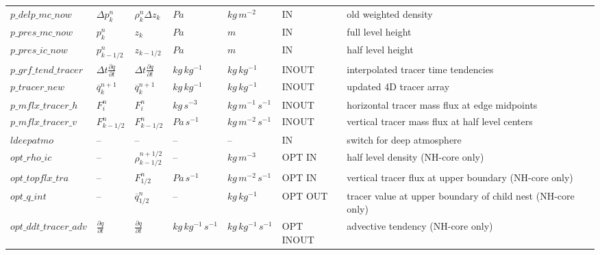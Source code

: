 \begin{landscape}
\begin{singlespacing}
\begin{longtable}{p{2.9cm}|x{2.3cm}|x{2.3cm}|x{1.9cm}|x{1.9cm}|x{2.2cm}|p{8.2cm}}
$p\_delp\_mc\_now$      &  $\Delta p^{n}_{k}$             &  $\rho^{n}_{k}\Delta z_{k}$   &  $Pa$           &  $kg\,m^{-2}$         &  IN       &  old weighted density\\
$p\_pres\_mc\_now$      &  $p^{n}_{k}$                    &  $z_{k}$                      &  $Pa$           &  $m$                  &  IN       &  full level height\\
$p\_pres\_ic\_now$      &  $p^{n}_{k-1/2}$                &  $z_{k-1/2}$                  &  $Pa$           &  $m$                  &  IN       &  half level height\\
$p\_grf\_tend\_tracer$  &  $\Delta t\frac{\partial q}{\partial t}$&  $\Delta t\frac{\partial q}{\partial t}$&  $kg\,kg^{-1}$&  $kg\,kg^{-1}$&  INOUT&  interpolated tracer time tendencies\\
$p\_tracer\_new$        &  $\overline{q}^{n+1}_{k}$       & $\overline{q}^{n+1}_{k}$      &  $kg\,kg^{-1}$  &  $kg\,kg^{-1}$        &  INOUT    &  updated 4D tracer array\\
$p\_mflx\_tracer\_h$    &  $F^{n}_{i}$                    &  $F^{n}_{i}$                  &  $kg\,s^{-3}$   &  $kg\,m^{-1}\,s^{-1}$ &  INOUT    &  horizontal tracer mass flux at edge midpoints\\
$p\_mflx\_tracer\_v$    &  $F^{n}_{k-1/2}$                &  $F^{n}_{k-1/2}$              &  $Pa\,s^{-1}$   &  $kg\,m^{-2}\,s^{-1}$ &  INOUT    &  vertical tracer mass flux at half level centers\\
$ldeepatmo$             &  --                             &  --                         &  --             &  --                 &  IN       &  switch for deep atmosphere\\
$opt\_rho\_ic$          &  --                             &  $\rho_{k-1/2}^{n+1/2}$       &  --             &  $kg\,m^{-3}$         &  OPT IN   &  half level density (NH-core only)\\
$opt\_topflx\_tra$      &  --                             &  $F^{n}_{1/2}$                &  $Pa\,s^{-1}$   &  $kg\,m^{-2}\,s^{-1}$ &  OPT IN   &  vertical tracer flux at upper boundary (NH-core only)\\
$opt\_q\_int$           &  --                             &  $\overline{q}^{n}_{1/2}$     &  --             &  $kg\,kg^{-1}$        &  OPT OUT  &  tracer value at upper boundary of child nest (NH-core only)\\
$opt\_ddt\_tracer\_adv$ &  $\frac{\partial q}{\partial t}$&  $\frac{\partial q}{\partial t}$ &  $kg\,kg^{-1}\,s^{-1}$&  $kg\,kg^{-1}\,s^{-1}$& OPT INOUT&  advective tendency (NH-core only)\\
\end{longtable}
\endgroup

\end{singlespacing}

\end{landscape}
\normalsize 

